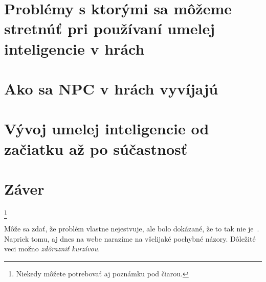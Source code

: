 \documentclass[10pt,twoside,slovak,a4paper]{article}
\begin{document}
\section{Problémy s ktorými sa môžeme stretnúť pri používaní umelej inteligencie v hrách} \label{dolezita}

\section{Ako sa NPC v hrách vyvíjajú} \label{dolezita}

\section{Vývoj umelej inteligencie od začiatku až po súčastnosť} \label{dolezita}


\section{Záver} \label{zaver} %


\footnote{Niekedy môžete potrebovať aj poznámku pod čiarou.}


Môže sa zdať, že problém vlastne nejestvuje\cite{Coplien:MPD}, ale bolo dokázané, že to tak nie je~\cite{Czarnecki:Staged, Czarnecki:Progress}. Napriek tomu, aj dnes na webe narazíme na všelijaké pochybné názory\cite{PLP-Framework}. Dôležité veci možno \emph{zdôrazniť kurzívou}.






\end{document}
